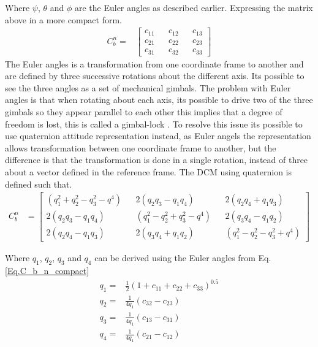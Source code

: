 Where $\psi$, $\theta$ and $\phi$ are the Euler angles as described earlier. Expressing the matrix above in a more compact form.
\begin{align}
C_b^n = &
\begin{bmatrix}
c_{11} && c_{12} && c_{13}\\
c_{21} && c_{22} && c_{23} \\
c_{31} && c_{32} && c_{33}
\end{bmatrix}
\label{Eq.C_b_n_compact}
\end{align}
The Euler angles is a transformation from one coordinate frame to another and are defined by three successive rotations about the different axis. Its possible to see the three angles as a set of mechanical gimbals. 
The problem with Euler angles is that when rotating about each axis, its possible to drive two of the three gimbals so they appear parallel to each other this implies that a degree of freedom is lost, this is called a gimbal-lock \cite{nonlinear}. To resolve this issue its possible to use quaternion attitude representation instead, as Euler angels the representation allows transformation between one coordinate frame to another, but the difference is that the transformation is done in a single rotation, instead of three about a vector defined in the reference frame. The DCM using quaternion is defined such that\cite{nonlinear}.
\begin{align}
C_b^n & =
\begin{bmatrix}
(q_1^2 + q_2^2 - q_3^2-q^4) && 2(q_2q_3 - q_1q_4) && 2(q_2q_4 + q_1q_3) \\
2(q_2q_3 - q_1q_4) && (q_1^2 - q_2^2 + q_3^2-q^4) && 2(q_3q_4 - q_1q_2) \\
2(q_2q_4 - q_1q_3) && 2(q_3q_4 + q_1q_2) && (q_1^2 - q_2^2 - q_3^2+q^4)
\end{bmatrix}
\end{align}

Where $q_1$, $q_2$, $q_3$ and $q_4$ can be derived using the Euler angles from Eq. \eqref{Eq.C_b_n_compact}
\begin{align*}
q_1 =& \frac{1}{2}(1+c_{11} + c_{22} + c_{33})^{0.5} \\
q_2 =& \frac{1}{4q_1}(c_{32} - c_{23})\\
q_3 =& \frac{1}{4q_1}(c_{13} - c_{31})\\
q_4 =& \frac{1}{4q_1}(c_{21} - c_{12})\\
\end{align*}


